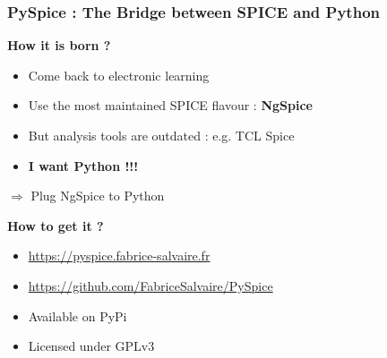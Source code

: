 
\begin{frame}
  \frametitle{PySpice :  The Bridge between SPICE and Python}
  \textbf{How it is born ?}
  \begin{itemize}
  \item Come back to electronic learning
  \item Use the most maintained SPICE flavour : \textbf{NgSpice}
  \item But analysis tools are outdated : e.g. TCL Spice
  \item \textbf{I want Python !!!}
  \end{itemize}
  \vspace{1.5em}
  \centerline{\alert{$\Longrightarrow$ Plug NgSpice to Python}}
  \vspace{1.5em}
  \textbf{How to get it ?}
  \begin{itemize}
  \item \url{https://pyspice.fabrice-salvaire.fr}
  \item \url{https://github.com/FabriceSalvaire/PySpice}
  \item Available on PyPi
  \item Licensed under GPLv3
  \end{itemize}
\end{frame}

